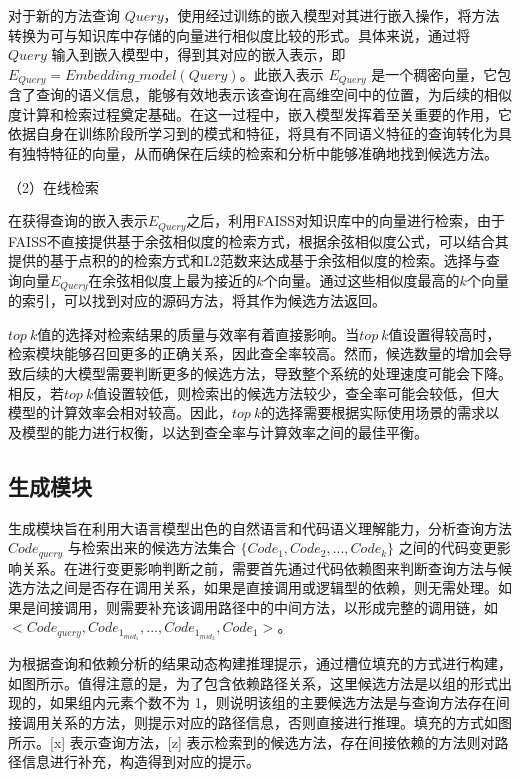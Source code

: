 对于新的方法查询 $Query$，使用经过训练的嵌入模型对其进行嵌入操作，将方法转换为可与知识库中存储的向量进行相似度比较的形式。具体来说，通过将 $Query$ 输入到嵌入模型中，得到其对应的嵌入表示，即 $E_{Query}=Embedding\_model(Query)$。此嵌入表示 $E_{Query}$ 是一个稠密向量，它包含了查询的语义信息，能够有效地表示该查询在高维空间中的位置，为后续的相似度计算和检索过程奠定基础。在这一过程中，嵌入模型发挥着至关重要的作用，它依据自身在训练阶段所学习到的模式和特征，将具有不同语义特征的查询转化为具有独特特征的向量，从而确保在后续的检索和分析中能够准确地找到候选方法。


（2）在线检索

在获得查询的嵌入表示$E_{Query}$之后，利用FAISS对知识库中的向量进行检索，由于FAISS不直接提供基于余弦相似度的检索方式，根据余弦相似度公式，可以结合其提供的基于点积的的检索方式和L2范数来达成基于余弦相似度的检索。选择与查询向量$E_{Query}$在余弦相似度上最为接近的$k$个向量。通过这些相似度最高的$k$个向量的索引，可以找到对应的源码方法，将其作为候选方法返回。

$top\ k$值的选择对检索结果的质量与效率有着直接影响。当$top\ k$值设置得较高时，检索模块能够召回更多的正确关系，因此查全率较高。然而，候选数量的增加会导致后续的大模型需要判断更多的候选方法，导致整个系统的处理速度可能会下降。相反，若$top\ k$值设置较低，则检索出的候选方法较少，查全率可能会较低，但大模型的计算效率会相对较高。因此，$top\ k$的选择需要根据实际使用场景的需求以及模型的能力进行权衡，以达到查全率与计算效率之间的最佳平衡。


\subsection{生成模块}

生成模块旨在利用大语言模型出色的自然语言和代码语义理解能力，分析查询方法 $Code_{query}$ 与检索出来的候选方法集合 $\{Code_1, Code_2, ..., Code_k\}$ 之间的代码变更影响关系。在进行变更影响判断之前，需要首先通过代码依赖图来判断查询方法与候选方法之间是否存在调用关系，如果是直接调用或逻辑型的依赖，则无需处理。如果是间接调用，则需要补充该调用路径中的中间方法，以形成完整的调用链，如$<Code_{query},Code_{1_{mid_1}},...,Code_{1_{mid_2}},Code_1>$。

为根据查询和依赖分析的结果动态构建推理提示，通过槽位填充的方式进行构建，如图\label{2_推理prompt}所示。值得注意的是，为了包含依赖路径关系，这里候选方法是以组的形式出现的，如果组内元素个数不为 1，则说明该组的主要候选方法是与查询方法存在间接调用关系的方法，则提示对应的路径信息，否则直接进行推理。填充的方式如图所示。[x] 表示查询方法，[z] 表示检索到的候选方法，存在间接依赖的方法则对路径信息进行补充，构造得到对应的提示。

